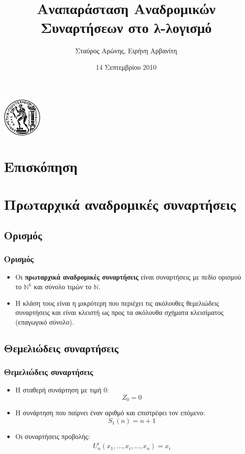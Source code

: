 \documentclass{beamer}
\title[Αναδρομικές Συναρτήσεις στο λ-λογισμό]
      {Αναπαράσταση Αναδρομικών Συναρτήσεων στο λ-λογισμό}
\author{Σταύρος Αρώνης, Ειρήνη Αρβανίτη}
\date{14 Σεπτεμβρίου 2010}
\institute{Εφαρμογές της λογικής στην Πληροφορική\\Σχολή ΗΜΜΥ, ΕΜΠ}
\begin{document}
\begin{frame}
  \titlepage
  \begin{center}
    \includegraphics[height=2cm]{pyrforos.png}
  \end{center}
\end{frame}

\section*{Επισκόπηση}

\begin{frame}
  \tableofcontents[hidesubsections]
\end{frame}

\section{Πρωταρχικά αναδρομικές συναρτήσεις}

\subsection{Ορισμός}

\begin{frame}
  \frametitle{Ορισμός}
  \begin{itemize}
  \item Οι \textbf{πρωταρχικά αναδρομικές συναρτήσεις} είναι
    συναρτήσεις με πεδίο ορισμού το $\mathbb{N}^k$ και σύνολο τιμών το
    $\mathbb{N}$.\pause
  \item Η κλάση τους είναι η μικρότερη που περιέχει τις ακόλουθες
    θεμελιώδεις συναρτήσεις και είναι κλειστή ως προς τα ακόλουθα
    σχήματα κλεισίματος (επαγωγικό σύνολο).
  \end{itemize}
\end{frame}

\subsection{Θεμελιώδεις συναρτήσεις}

\begin{frame}
  \frametitle{Θεμελιώδεις συναρτήσεις}
  \begin{itemize}
  \item Η σταθερή συνάρτηση με τιμή 0: $$Z_0=0$$
  \item Η συνάρτηση που παίρνει έναν αριθμό και επιστρέφει τον
    επόμενο: $$S_1(n)=n+1$$
  \item Οι συναρτήσεις
    προβολής: $$U^i_n(x_1,\ldots,x_i,\ldots,x_n)=x_i$$
  \end{itemize}
\end{frame}
\end{document}
